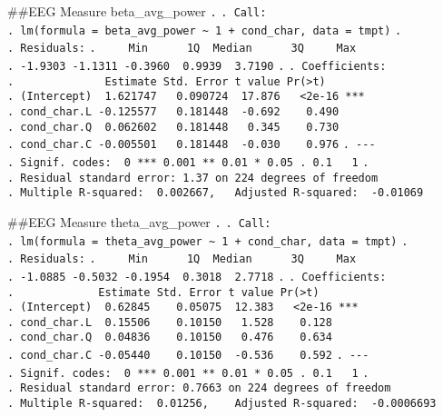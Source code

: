 \documentclass[
]{article}
\begin{document}
\#\#EEG Measure beta\_avg\_power \texttt{.} \texttt{.\ Call:}
\texttt{.\ lm(formula\ =\ beta\_avg\_power\ \textasciitilde{}\ 1\ +\ cond\_char,\ data\ =\ tmpt)}
\texttt{.} \texttt{.\ Residuals:}
\texttt{.\ \ \ \ \ Min\ \ \ \ \ \ 1Q\ \ Median\ \ \ \ \ \ 3Q\ \ \ \ \ Max}
\texttt{.\ -1.9303\ -1.1311\ -0.3960\ \ 0.9939\ \ 3.7190} \texttt{.}
\texttt{.\ Coefficients:}
\texttt{.\ \ \ \ \ \ \ \ \ \ \ \ \ \ Estimate\ Std.\ Error\ t\ value\ Pr(\textgreater{}\textbar{}t\textbar{})}
\texttt{.\ (Intercept)\ \ 1.621747\ \ \ 0.090724\ \ 17.876\ \ \ \textless{}2e-16\ ***}
\texttt{.\ cond\_char.L\ -0.125577\ \ \ 0.181448\ \ -0.692\ \ \ \ 0.490}
\texttt{.\ cond\_char.Q\ \ 0.062602\ \ \ 0.181448\ \ \ 0.345\ \ \ \ 0.730}
\texttt{.\ cond\_char.C\ -0.005501\ \ \ 0.181448\ \ -0.030\ \ \ \ 0.976}
\texttt{.\ -\/-\/-}
\texttt{.\ Signif.\ codes:\ \ 0\ \textquotesingle{}***\textquotesingle{}\ 0.001\ \textquotesingle{}**\textquotesingle{}\ 0.01\ \textquotesingle{}*\textquotesingle{}\ 0.05\ \textquotesingle{}.\textquotesingle{}\ 0.1\ \textquotesingle{}\ \textquotesingle{}\ 1}
\texttt{.}
\texttt{.\ Residual\ standard\ error:\ 1.37\ on\ 224\ degrees\ of\ freedom}
\texttt{.\ Multiple\ R-squared:\ \ 0.002667,\ \ \ Adjusted\ R-squared:\ \ -0.01069}

\#\#EEG Measure theta\_avg\_power \texttt{.} \texttt{.\ Call:}
\texttt{.\ lm(formula\ =\ theta\_avg\_power\ \textasciitilde{}\ 1\ +\ cond\_char,\ data\ =\ tmpt)}
\texttt{.} \texttt{.\ Residuals:}
\texttt{.\ \ \ \ \ Min\ \ \ \ \ \ 1Q\ \ Median\ \ \ \ \ \ 3Q\ \ \ \ \ Max}
\texttt{.\ -1.0885\ -0.5032\ -0.1954\ \ 0.3018\ \ 2.7718} \texttt{.}
\texttt{.\ Coefficients:}
\texttt{.\ \ \ \ \ \ \ \ \ \ \ \ \ Estimate\ Std.\ Error\ t\ value\ Pr(\textgreater{}\textbar{}t\textbar{})}
\texttt{.\ (Intercept)\ \ 0.62845\ \ \ \ 0.05075\ \ 12.383\ \ \ \textless{}2e-16\ ***}
\texttt{.\ cond\_char.L\ \ 0.15506\ \ \ \ 0.10150\ \ \ 1.528\ \ \ \ 0.128}
\texttt{.\ cond\_char.Q\ \ 0.04836\ \ \ \ 0.10150\ \ \ 0.476\ \ \ \ 0.634}
\texttt{.\ cond\_char.C\ -0.05440\ \ \ \ 0.10150\ \ -0.536\ \ \ \ 0.592}
\texttt{.\ -\/-\/-}
\texttt{.\ Signif.\ codes:\ \ 0\ \textquotesingle{}***\textquotesingle{}\ 0.001\ \textquotesingle{}**\textquotesingle{}\ 0.01\ \textquotesingle{}*\textquotesingle{}\ 0.05\ \textquotesingle{}.\textquotesingle{}\ 0.1\ \textquotesingle{}\ \textquotesingle{}\ 1}
\texttt{.}
\texttt{.\ Residual\ standard\ error:\ 0.7663\ on\ 224\ degrees\ of\ freedom}
\texttt{.\ Multiple\ R-squared:\ \ 0.01256,\ \ \ \ Adjusted\ R-squared:\ \ -0.0006693}
\end{document}
